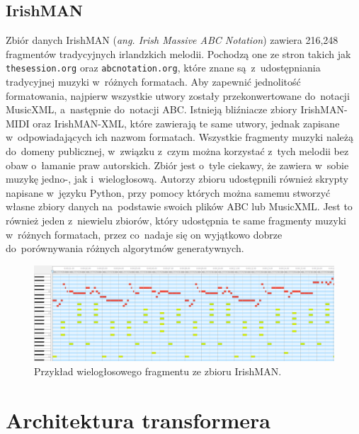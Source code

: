 \documentclass[data-science]{agh-wi} %
\begin{document}
\subsection{IrishMAN}
Zbiór danych IrishMAN (\textit{ang. Irish Massive ABC Notation}) \cite{irishman} zawiera 216,248 fragmentów tradycyjnych irlandzkich melodii. Pochodzą one ze stron takich jak \texttt{thesession.org} oraz \texttt{abcnotation.org}, które znane są~z~udostępniania tradycyjnej muzyki w~różnych formatach. Aby zapewnić jednolitość formatowania, najpierw wszystkie utwory zostały przekonwertowane do~notacji MusicXML, a~następnie do~notacji ABC. Istnieją bliźniacze zbiory IrishMAN-MIDI oraz IrishMAN-XML, które zawierają te same utwory, jednak zapisane w~odpowiadających ich nazwom formatach. Wszystkie fragmenty muzyki należą do~domeny publicznej, w~związku z~czym można korzystać z~tych melodii bez obaw o~łamanie praw autorskich. Zbiór jest o~tyle ciekawy, że zawiera w~sobie muzykę jedno-, jak i~wielogłosową. Autorzy zbioru udostępnili również skrypty napisane w~języku Python, przy pomocy których można samemu stworzyć własne zbiory danych na~podstawie swoich plików ABC lub MusicXML. Jest to również jeden z~niewielu zbiorów, który udostępnia te same fragmenty muzyki w~różnych formatach, przez co~nadaje się on wyjątkowo dobrze do~porównywania różnych algorytmów generatywnych.

\begin{figure}[ht!]
    \begin{center}
        \includegraphics[width=0.9\linewidth]{./img/irishman_midi.png}
    \end{center}
    \caption{Przykład wielogłosowego fragmentu ze zbioru IrishMAN.}\label{fig:irish_midi}
\end{figure}

\section{Architektura transformera}
\end{document}
